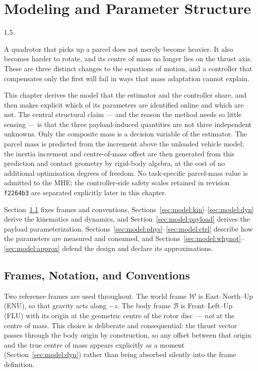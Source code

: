 \chapter{Modeling and Parameter Structure}\label{ch:model}
\begin{spacing}{1.5}
\setlength{\parskip}{0.22in}

A quadrotor that picks up a parcel does not merely become heavier. It
also becomes harder to rotate, and its centre of mass no longer lies on
the thrust axis. These are three distinct changes to the equations of
motion, and a controller that compensates only the first will fail in
ways that mass adaptation cannot explain.

This chapter derives the model that the estimator and the controller
share, and then makes explicit which of its parameters are identified
online and which are not. The central structural claim --- and the reason
the method needs so little sensing --- is that the three payload-induced
quantities are not three independent unknowns. Only the composite mass is
a decision variable of the estimator. The parcel mass is predicted from
the increment above the unloaded vehicle model; the inertia increment and
centre-of-mass offset are then generated from this prediction and contact
geometry by rigid-body algebra, at the cost of no additional optimisation
degrees of freedom. No task-specific parcel-mass value is admitted to the
MHE; the controller-side safety scales retained in revision
\texttt{f2264b3} are separated explicitly later in this chapter.

Section~\ref{sec:model:frames} fixes frames and conventions,
Sections~\ref{sec:model:kin}--\ref{sec:model:dyn} derive the kinematics
and dynamics, and Section~\ref{sec:model:payload} derives the payload
parameterization. Sections~\ref{sec:model:phys}--\ref{sec:model:ctrl}
describe how the parameters are measured and consumed, and
Sections~\ref{sec:model:whynot}--\ref{sec:model:approx} defend the design
and declare its approximations.

\section{Frames, Notation, and Conventions}\label{sec:model:frames}

Two reference frames are used throughout. The world frame $\mathcal{W}$
is East--North--Up (ENU), so that gravity acts along $-z$. The body frame
$\mathcal{B}$ is Front--Left--Up (FLU) with its origin at the geometric
centre of the rotor disc --- \emph{not} at the centre of mass. This
choice is deliberate and consequential: the thrust vector passes through
the body origin by construction, so any offset between that origin and
the true centre of mass appears explicitly as a moment
(Section~\ref{sec:model:dyn}) rather than being absorbed silently into
the frame definition.


\end{spacing}
